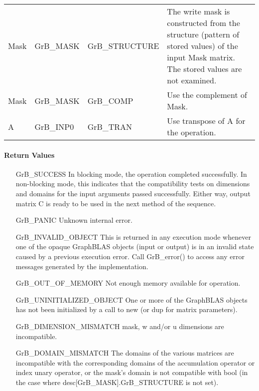 \begin{itemize}[leftmargin=1.1in]
\begin{tabular}{lllp{2.7in}}
        {\sf Mask} & {\sf GrB\_MASK} & {\sf GrB\_STRUCTURE}   & The write mask is
        constructed from the structure (pattern of stored values) of the input
        {\sf Mask} matrix. The stored values are not examined.\\

        {\sf Mask} & {\sf GrB\_MASK} & {\sf GrB\_COMP}   & Use the 
        complement of {\sf Mask}. \\

        {\sf A}    & {\sf GrB\_INP0} & {\sf GrB\_TRAN}   & Use transpose of {\sf A}
        for the operation. \\
    \end{tabular}
\end{itemize}


\paragraph{Return Values}

\begin{itemize}[leftmargin=2.1in]
    \item[{\sf GrB\_SUCCESS}]         In blocking mode, the operation completed
    successfully. In non-blocking mode, this indicates that the compatibility 
    tests on dimensions and domains for the input arguments passed successfully. 
    Either way, output matrix {\sf C} is ready to be used in the next method of 
    the sequence.

    \item[{\sf GrB\_PANIC}]           Unknown internal error.

    \item[{\sf GrB\_INVALID\_OBJECT}] This is returned in any execution mode 
    whenever one of the opaque GraphBLAS objects (input or output) is in an invalid 
    state caused by a previous execution error.  Call {\sf GrB\_error()} to access 
    any error messages generated by the implementation.

    \item[{\sf GrB\_OUT\_OF\_MEMORY}] Not enough memory available for operation.

    \item[{\sf GrB\_UNINITIALIZED\_OBJECT}] One or more of the GraphBLAS objects
    has not been initialized by a call to {\sf new} (or {\sf dup} for matrix
    parameters).

    \item[{\sf GrB\_DIMENSION\_MISMATCH}]  {\sf mask}, {\sf w} and/or {\sf u}
    dimensions are incompatible.

    \item[{\sf GrB\_DOMAIN\_MISMATCH}]    The domains of the various matrices are
    incompatible with the corresponding domains of the accumulation operator
    or index unary operator, or the mask's domain is not compatible with {\sf bool}
    (in the case where {\sf desc[GrB\_MASK].GrB\_STRUCTURE} is not set).
\end{itemize}

